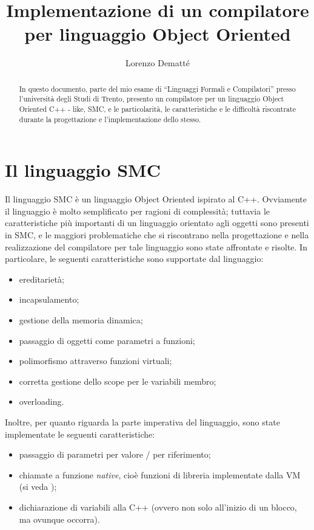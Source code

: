 \documentclass[a4paper, 11pt]{article}
\begin{document}
\title{Implementazione di un compilatore per linguaggio Object Oriented}
\author{Lorenzo Dematt\'e}

\maketitle

\begin{abstract}
In questo documento, parte del mio esame di ``Linguaggi Formali e Compilatori'' presso l'universit\`a degli Studi di Trento, presento un compilatore per un linguaggio Object Oriented C++ - like, SMC, e le particolarit\`a, le caratteristiche e le difficolt\`a riscontrate durante la progettazione e l'implementazione dello stesso.
\end{abstract}
\pagebreak

\section{Il linguaggio SMC}

Il linguaggio SMC \`e un linguaggio Object Oriented ispirato al C++. Ovviamente il linguaggio \`e molto semplificato per ragioni di complessit\`a; tuttavia le caratteristiche pi\`u importanti di un linguaggio orientato agli oggetti sono presenti in SMC, e le maggiori problematiche che si riscontrano nella progettazione e nella realizzazione del compilatore per tale linguaggio sono state affrontate e risolte. In particolare, le seguenti caratteristiche sono supportate dal linguaggio:

\begin{itemize}
\item ereditariet\`a;
\item incapsulamento;
\item gestione della memoria dinamica;
\item passaggio di oggetti come parametri a funzioni;
\item polimorfismo attraverso funzioni virtuali;
\item corretta gestione dello scope per le variabili membro;
\item overloading.
\end{itemize}

Inoltre, per quanto riguarda la parte imperativa del linguaggio, sono state implementate le seguenti caratteristiche:

\begin{itemize}
\item passaggio di parametri per valore / per riferimento;
\item chiamate a funzione \emph{native}, cio\`e funzioni di libreria implementate dalla VM (si veda \cite{Fubi});
\item dichiarazione di variabili alla C++ (ovvero non solo all'inizio di un blocco, ma ovunque occorra).
\end{itemize}
\end{document}

